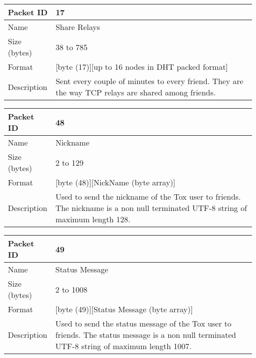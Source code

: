 \documentclass{tox}
\begin{document}
\begin{tabular}[pos]{|l|p{9cm}|}

\hline
Packet ID       &      17
\\ \hline
Name            &      Share Relays
\\
\hline
Size (bytes)    &      38 to 785
\\ \hline
Format          &      [byte (17)][up to 16 nodes in DHT packed format]
\\ \hline
Description     &      Sent every couple of minutes to every friend. They are 
                       the way TCP relays are shared among friends.
\\ \hline

\end{tabular}

\begin{tabular}[pos]{|l|p{9cm}|}

\hline
Packet ID       &      48
\\ \hline
Name            &      Nickname
\\ \hline
Size (bytes)    &      2 to 129
\\ \hline
Format          &      [byte (48)][NickName            (byte array)]
\\ \hline
Description     &      Used to send the nickname of the Tox user to friends. 
                       The nickname is a non null terminated UTF-8 string of 
                       maximum length 128.
\\ \hline

\end{tabular}

\begin{tabular}[pos]{|l|p{9cm}|}

\hline
Packet ID       &      49
\\ \hline
Name            &      Status Message
\\ \hline
Size (bytes)    &      2 to 1008
\\ \hline
Format          &      [byte (49)][Status Message (byte array)]
\\ \hline
Description     &      Used to send the status message of the Tox user to 
                       friends. The status message is a non null terminated 
                       UTF-8 string of maximum length 1007.
\\ \hline

\end{tabular}
\end{document}
